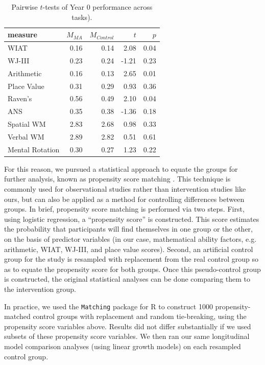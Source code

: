 \documentclass[11pt]{article}
\begin{document}
\begin{table}[ht]
\centering
\caption{\label{tab:pairwise} Pairwise $t$-tests of Year 0 performance across tasks).}
\begin{tabular}{lrrrr}
  \hline
measure & $M_{MA}$ & $M_{Control}$ & $t$ & $p$ \\ 
  \hline
WIAT & 0.16 & 0.14 & 2.08 & 0.04 \\ 
WJ-III & 0.23 & 0.24 & -1.21 & 0.23 \\ 
Arithmetic & 0.16 & 0.13 & 2.65 & 0.01 \\ 
Place Value & 0.31 & 0.29 & 0.93 & 0.36 \\ 
Raven's & 0.56 & 0.49 & 2.10 & 0.04 \\ 
ANS & 0.35 & 0.38 & -1.36 & 0.18 \\ 
Spatial WM & 2.83 & 2.68 & 0.98 & 0.33 \\ 
Verbal WM & 2.89 & 2.82 & 0.51 & 0.61 \\ 
Mental Rotation & 0.30 & 0.27 & 1.23 & 0.22 \\ 
   \hline
\end{tabular}
\end{table}

For this reason, we pursued a statistical approach to equate the groups for further analysis, known as propensity score matching \cite{rosenbaum1983,sekhon2008}. This technique is commonly used for observational studies rather than intervention studies like ours, but can also be applied as a method for controlling differences between groups. In brief, propensity score matching is performed via two steps. First, using logistic regression, a ``propensity score'' is constructed. This score estimates the probability that participants will find themselves in one group or the other, on the basis of predictor variables (in our case, mathematical ability factors, e.g. arithmetic, WIAT, WJ-III, and place value scores). Second, an artificial control group for the study is resampled with replacement from the real control group so as to equate the propensity score for both groups. Once this pseudo-control group is constructed, the original statistical analyses can be done comparing them to the intervention group. 

In practice, we used the \texttt{Matching} package for R \cite{sekhon2008} to construct 1000 propensity-matched control groups with replacement and random tie-breaking, using the propensity score variables above. Results did not differ substantially if we used subsets of these propensity score variables. We then ran our same longitudinal model comparison analyses (using linear growth models) on each resampled control group. 
\end{document}

